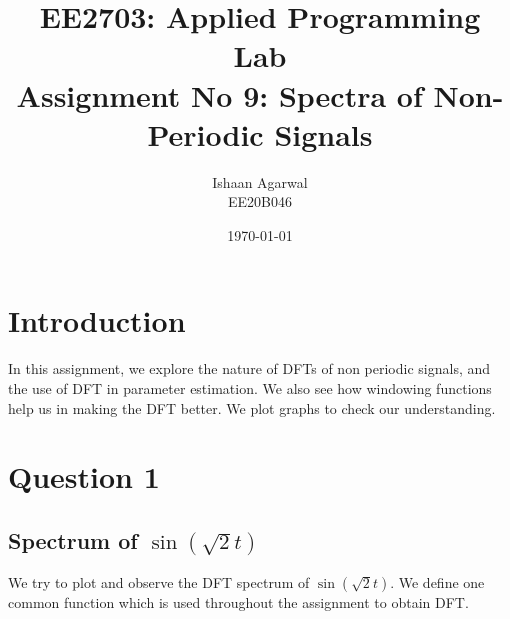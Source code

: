 \documentclass[11pt, a4paper]{article}
\title{EE2703: Applied Programming Lab \\ Assignment No 9: Spectra of Non-Periodic Signals} %
\author{Ishaan Agarwal \\ EE20B046} %
\date{\today} %
\begin{document}
		
		
\maketitle %

\section{Introduction}
In this assignment, we explore the nature of DFTs of non periodic signals,
and the use of DFT in parameter estimation. We also see how windowing functions help us in making the DFT better. We plot graphs to check our understanding.

\section{Question 1}
\subsection*{Spectrum of $\sin(\sqrt{2}t)$}
We try to plot and observe the DFT spectrum of $\sin(\sqrt{2}t)$.
We define one common function which is used throughout the assignment to obtain DFT.\\
\end{document}
